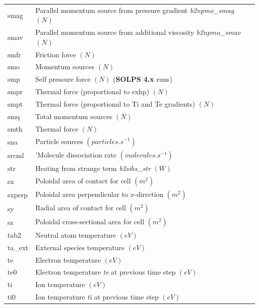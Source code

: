 \documentclass[a4paper,10pt]{report}
\newcommand\SOLPSfour{{\bf SOLPS 4.x} }
\begin{document}
\begin{center}
\begin{longtable}{|l|l|}
    smag     & \index{b2plot, smag} Parallel momentum source from pressure gradient {\em b2npmo\_smag} $(N)$ \\
    smav     & \index{b2plot, smav} Parallel momentum source from additional viscosity {\em b2npmo\_smav} $(N)$ \\
    smfr     & \index{b2plot, smfr} Friction force $(N)$ \\
    smo      & \index{b2plot, smo} Momentum sources $(N)$ \\
    smp      & \index{b2plot, smp} Self pressure force $(N)$ (\SOLPSfour runs) \\
    smpr     & \index{b2plot, smpr} Thermal force (proportional to exhp) $(N)$ \\
    smpt     & \index{b2plot, smpt} Thermal force (proportional to Ti and Te gradients) $(N)$ \\
    smq      & \index{b2plot, smq} Total momentum sources $(N)$ \\
    smth     & \index{b2plot, smth} Thermal force $(N)$ \\
    sna      & \index{b2plot, sna} Particle sources $(particles.s^{-1})$ \\
    srcml    & \index{b2plot, srcml} 'Molecule dissociation rate $(molecules.s^{-1})$ \\
    str      & \index{b2plot, str} Heating from strange term {\em b2sihs\_str} $(W)$ \\
    sx       & \index{b2plot, sx} Poloidal area of contact for cell $(m^2)$ \\
    sxperp   & \index{b2plot, sxperp} Poloidal area perpendicular to $x$-direction $(m^2)$ \\
    sy       & \index{b2plot, sy} Radial area of contact for cell $(m^2)$ \\
    sz       & \index{b2plot, sz} Poloidal cross-sectional area for cell $(m^2)$ \\
    tab2     & \index{b2plot, tab2} Neutral atom temperature $(eV)$ \\
    ta\_ext  & \index{b2plot, ta\_ext} External species temperature $(eV)$ \\
    te       & \index{b2plot, te} Electron temperature $(eV)$ \\
    te0      & \index{b2plot, te0} Electron temperature {\em te} at previous time step $(eV)$ \\
    ti       & \index{b2plot, ti} Ion temperature $(eV)$ \\
    ti0      & \index{b2plot, ti0} Ion temperature {\em ti} at previous time step $(eV)$ \\

\end{longtable}
\end{center}
\end{document}
